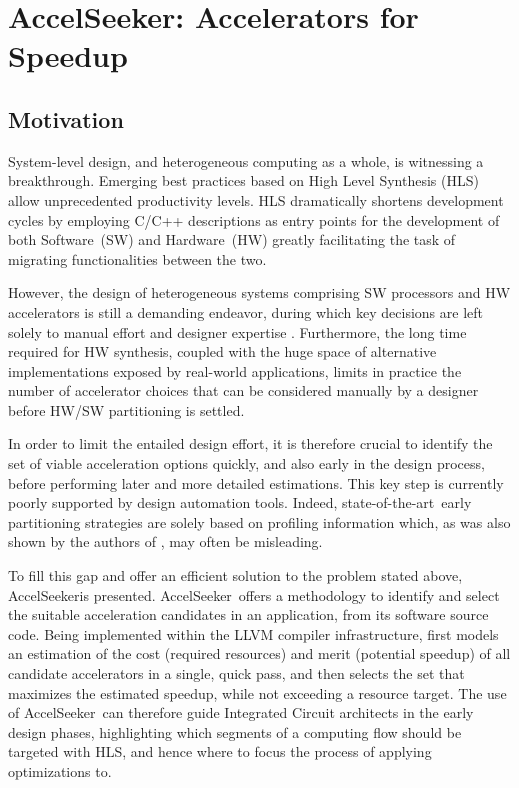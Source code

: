 \documentclass[]{usiinfthesis}
\newcommand{\aseeker}{{AccelSeeker}}
\newcommand{\HW}{{Hardware}}
\newcommand{\SW}{{Software}}
\newcommand{\SoTA}{{state-of-the-art}}
\begin{document}
\section{\aseeker: Accelerators for Speedup}

\subsection{Motivation}

System-level design, and heterogeneous computing as a whole, is witnessing a breakthrough. 
Emerging best practices based on High Level Synthesis (HLS) allow unprecedented productivity levels. 
HLS dramatically shortens development cycles by employing C/C++ descriptions as entry points 
for the development of both \SW\ (SW) and \HW\ (HW) greatly facilitating the task of migrating 
functionalities between the two.\par

However, the design of heterogeneous systems comprising SW processors and HW accelerators is still a 
demanding endeavor, during which key decisions are left solely to manual effort and designer expertise 
\cite{CacciottiSep18} \cite{NouriJun17}. Furthermore, the long time required for HW synthesis, coupled 
with the huge space of alternative implementations exposed by real-world applications, limits in practice 
the number of accelerator choices that can be considered manually by a designer before HW/SW partitioning 
is settled.\par

In order to limit the entailed design effort, it is therefore crucial to identify the set of viable 
acceleration options quickly, and also early in the design process, before performing later and more 
detailed estimations. This key step is currently poorly supported by design automation tools. Indeed, 
\SoTA\ early partitioning strategies are solely based on profiling information \cite{XilinxESTRef18} 
\cite{LattnerMar04} which, as was also shown by the authors of \cite{SyrowikJun18}, may often be 
misleading.\par

To fill this gap and offer an efficient solution to the problem stated above, \aseeker is presented. 
\aseeker\ offers a methodology to identify and select the suitable acceleration candidates in an
application, from its software source code. Being implemented within the LLVM \cite{LattnerMar04} compiler 
infrastructure, first models an estimation of the cost (required resources) and merit (potential speedup) 
of all candidate accelerators in a single, quick pass, and then selects the set that maximizes the estimated 
speedup, while not exceeding a resource target. The use of \aseeker\ can therefore guide Integrated Circuit 
architects in the early design phases, highlighting which segments of a computing flow should be
targeted with HLS, and hence where to focus the process of applying optimizations to.\par
\end{document}
